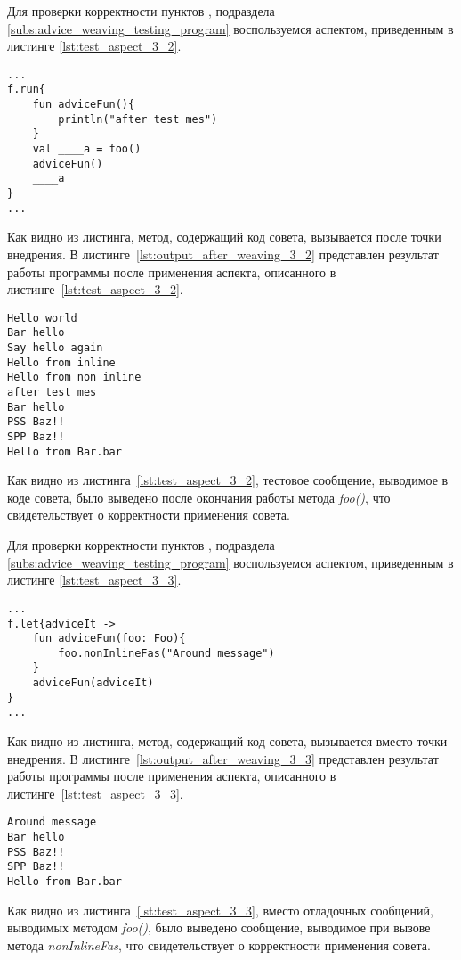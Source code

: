 Для проверки корректности пунктов \quotes{\ref{list:after_advice_weaving_check}},
\quotes{\ref{list:program_work_check}}  подраздела \ref{subs:advice_weaving_testing_program} воспользуемся аспектом, приведенным в листинге \ref{lst:test_aspect_3_2}.
\begin{lstlisting}[style={java}, label={lst:result_of_weaving_3_2},
 caption={Результат применения аспекта, описанного в листинге~\ref{lst:test_aspect_3_2}, к тестовой программе}]
...
f.run{
	fun adviceFun(){
        println("after test mes")
    }
	val ____a = foo()
	adviceFun()
	____a
}
...
\end{lstlisting}
Как видно из листинга, метод, содержащий код совета, вызывается после точки внедрения.
В листинге~\ref{lst:output_after_weaving_3_2} представлен результат работы программы после применения аспекта, описанного в листинге~\ref{lst:test_aspect_3_2}. 
\begin{lstlisting}[style={java}, label={lst:output_after_weaving_3_2},
 caption={Результат работы программы после применения аспекта, описанного в листинге~\ref{lst:test_aspect_3_2}}]
Hello world
Bar hello
Say hello again
Hello from inline
Hello from non inline
after test mes
Bar hello
PSS Baz!!
SPP Baz!!
Hello from Bar.bar
\end{lstlisting}
Как видно из листинга~\ref{lst:test_aspect_3_2}, тестовое сообщение, выводимое в коде совета, было выведено после окончания работы метода \textit{foo()}, что свидетельствует о корректности применения совета.

Для проверки корректности пунктов \quotes{\ref{list:around_advice_weaving_check}},
\quotes{\ref{list:program_work_check}}  подраздела \ref{subs:advice_weaving_testing_program} воспользуемся аспектом, приведенным в листинге \ref{lst:test_aspect_3_3}.
\begin{lstlisting}[style={java}, label={lst:result_of_weaving_3_3},
 caption={Результат применения аспекта, описанного в листинге~\ref{lst:test_aspect_3_3}, к тестовой программе}]
...
f.let{adviceIt ->
	fun adviceFun(foo: Foo){
        foo.nonInlineFas("Around message")
    }
	adviceFun(adviceIt)
}
...
\end{lstlisting}
Как видно из листинга, метод, содержащий код совета, вызывается вместо точки внедрения.
В листинге~\ref{lst:output_after_weaving_3_3} представлен результат работы программы после применения аспекта, описанного в листинге~\ref{lst:test_aspect_3_3}. 
\begin{lstlisting}[style={java}, label={lst:output_after_weaving_3_3},
 caption={Результат работы программы после применения аспекта, описанного в листинге~\ref{lst:test_aspect_3_3}}]
Around message
Bar hello
PSS Baz!!
SPP Baz!!
Hello from Bar.bar
\end{lstlisting}
Как видно из листинга~\ref{lst:test_aspect_3_3}, вместо отладочных сообщений, выводимых методом \textit{foo()}, было выведено сообщение, выводимое при вызове метода \textit{nonInlineFas}, что свидетельствует о корректности применения совета.

